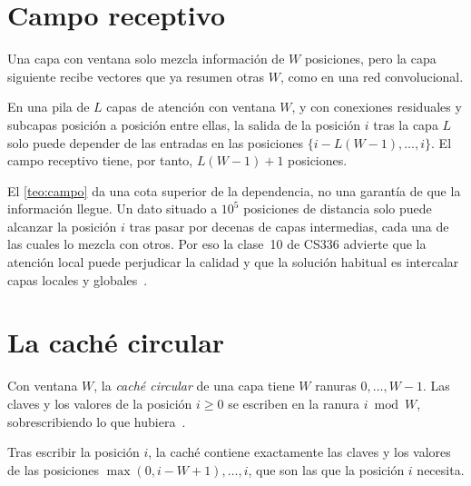 \section{Campo receptivo}

Una capa con ventana solo mezcla información de $W$ posiciones, pero la capa siguiente recibe vectores que ya resumen otras $W$, como en una red convolucional.

\begin{teorema}\label{teo:campo}
En una pila de $L$ capas de atención con ventana $W$, y con conexiones residuales y subcapas posición a posición entre ellas, la salida de la posición $i$ tras la capa $L$ solo puede depender de las entradas en las posiciones $\{i-L(W-1),\dots,i\}$. El campo receptivo tiene, por tanto, $L(W-1)+1$ posiciones.
\end{teorema}

\addtocounter{definicion}{1}%

\begin{observacion}
El \cref{teo:campo} da una cota superior de la dependencia, no una garantía de que la información llegue. Un dato situado a $10^{5}$ posiciones de distancia solo puede alcanzar la posición $i$ tras pasar por decenas de capas intermedias, cada una de las cuales lo mezcla con otros. Por eso la clase~10 de CS336 advierte que la atención local puede perjudicar la calidad y que la solución habitual es intercalar capas locales y globales~\cite{cs336}.
\end{observacion}

\section{La caché circular}

\begin{definicion}\label{def:circular}
Con ventana $W$, la \emph{caché circular} de una capa tiene $W$ ranuras $0,\dots,W-1$. Las claves y los valores de la posición $i\ge 0$ se escriben en la ranura $i\bmod W$, sobrescribiendo lo que hubiera~\cite[§2]{mistral}.
\end{definicion}

\begin{proposicion}\label{prop:circular}
Tras escribir la posición $i$, la caché contiene exactamente las claves y los valores de las posiciones $\max(0,i-W+1),\dots,i$, que son las que la posición $i$ necesita.
\end{proposicion}

